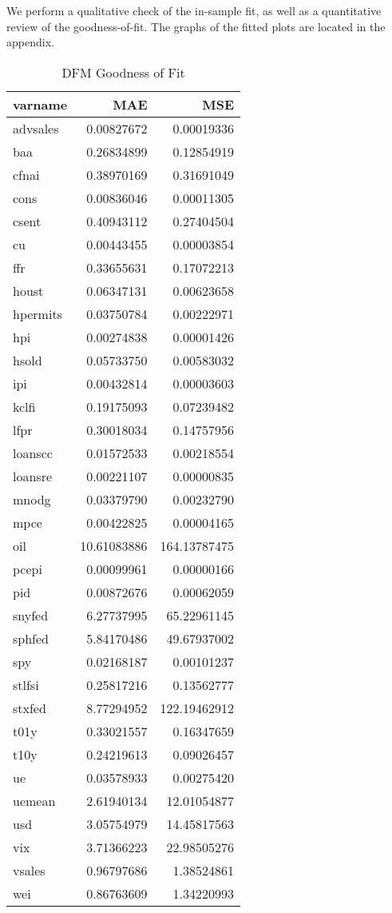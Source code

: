 \documentclass[11pt, letterpaper]{article}\usepackage[]{graphicx}\usepackage[]{color}
\begin{document}
We perform a qualitative check of the in-sample fit, as well as a quantitative review of the goodness-of-fit. The graphs of the fitted plots are located in the appendix.
\begin{table}[H]
\centering
\begingroup\footnotesize
\begin{tabular}{lrr}
  \hline
varname & MAE & MSE \\ 
  \hline
advsales & 0.00827672 & 0.00019336 \\ 
  baa & 0.26834899 & 0.12854919 \\ 
  cfnai & 0.38970169 & 0.31691049 \\ 
  cons & 0.00836046 & 0.00011305 \\ 
  csent & 0.40943112 & 0.27404504 \\ 
  cu & 0.00443455 & 0.00003854 \\ 
  ffr & 0.33655631 & 0.17072213 \\ 
  houst & 0.06347131 & 0.00623658 \\ 
  hpermits & 0.03750784 & 0.00222971 \\ 
  hpi & 0.00274838 & 0.00001426 \\ 
  hsold & 0.05733750 & 0.00583032 \\ 
  ipi & 0.00432814 & 0.00003603 \\ 
  kclfi & 0.19175093 & 0.07239482 \\ 
  lfpr & 0.30018034 & 0.14757956 \\ 
  loanscc & 0.01572533 & 0.00218554 \\ 
  loansre & 0.00221107 & 0.00000835 \\ 
  mnodg & 0.03379790 & 0.00232790 \\ 
  mpce & 0.00422825 & 0.00004165 \\ 
  oil & 10.61083886 & 164.13787475 \\ 
  pcepi & 0.00099961 & 0.00000166 \\ 
  pid & 0.00872676 & 0.00062059 \\ 
  snyfed & 6.27737995 & 65.22961145 \\ 
  sphfed & 5.84170486 & 49.67937002 \\ 
  spy & 0.02168187 & 0.00101237 \\ 
  stlfsi & 0.25817216 & 0.13562777 \\ 
  stxfed & 8.77294952 & 122.19462912 \\ 
  t01y & 0.33021557 & 0.16347659 \\ 
  t10y & 0.24219613 & 0.09026457 \\ 
  ue & 0.03578933 & 0.00275420 \\ 
  uemean & 2.61940134 & 12.01054877 \\ 
  usd & 3.05754979 & 14.45817563 \\ 
  vix & 3.71366223 & 22.98505276 \\ 
  vsales & 0.96797686 & 1.38524861 \\ 
  wei & 0.86763609 & 1.34220993 \\ 
   \hline
\end{tabular}
\endgroup
\caption{DFM Goodness of Fit} 
\end{table}
\end{document}

